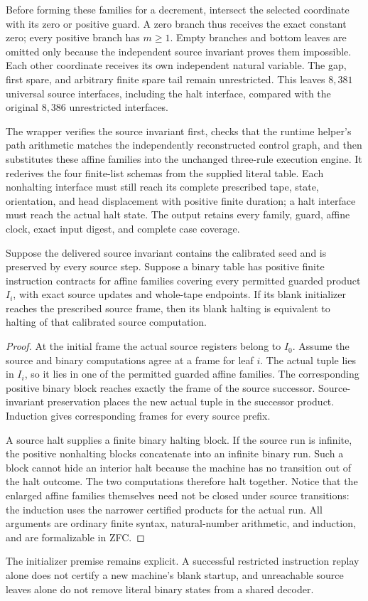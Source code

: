 Before forming these families for a decrement, intersect the selected
coordinate with its zero or positive guard.  A zero branch thus receives the
exact constant zero; every positive branch has $m\ge1$.  Empty branches and
bottom leaves are omitted only because the independent source invariant
proves them impossible.  Each other coordinate receives its own independent
natural variable.  The gap, first spare, and arbitrary finite spare tail remain
unrestricted.  This leaves $8{,}381$ universal source interfaces, including the
halt interface, compared with the original $8{,}386$ unrestricted interfaces.

The wrapper  verifies
the source invariant first, checks that the runtime helper's path arithmetic
matches the independently reconstructed control graph, and then substitutes
these affine families into the unchanged three-rule execution engine.  It
rederives the four finite-list schemas from the supplied literal table.  Each
nonhalting interface must still reach its complete prescribed tape, state,
orientation, and head displacement with positive finite duration; a halt
interface must reach the actual halt state.  The output retains every family,
guard, affine clock, exact input digest, and complete case coverage.

\begin{proposition}
Suppose the delivered source invariant contains the calibrated seed and is
preserved by every source step.  Suppose a binary table has positive finite
instruction contracts for affine families covering every permitted guarded
product $I_i$, with exact source updates and whole-tape endpoints.  If its
blank initializer reaches the prescribed source frame, then its blank halting
is equivalent to halting of that calibrated source computation.
\end{proposition}

\begin{proof}
At the initial frame the actual source registers belong to $I_0$.  Assume the
source and binary computations agree at a frame for leaf $i$.  The actual
tuple lies in $I_i$, so it lies in one of the permitted guarded affine
families.  The corresponding positive binary block reaches exactly the frame
of the source successor.  Source-invariant preservation places the new actual
tuple in the successor product.  Induction gives corresponding frames for
every source prefix.

A source halt supplies a finite binary halting block.  If the source run is
infinite, the positive nonhalting blocks concatenate into an infinite binary
run.  Such a block cannot hide an interior halt because the machine has no
transition out of the halt outcome.  The two computations therefore halt
together.  Notice that the enlarged affine families themselves need not be
closed under source transitions: the induction uses the narrower certified
products for the actual run.  All arguments are ordinary finite syntax,
natural-number arithmetic, and induction, and are formalizable in ZFC.
\end{proof}

The initializer premise remains explicit.  A successful restricted instruction
replay alone does not certify a new machine's blank startup, and unreachable
source leaves alone do not remove literal binary states from a shared decoder.
